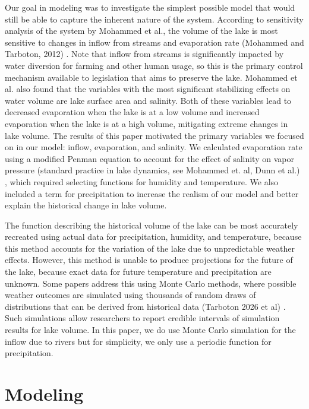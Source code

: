 \documentclass[12pt]{article}
\begin{document}
Our goal in modeling was to investigate the simplest possible model that would still be able to capture the inherent nature of the system. According to sensitivity analysis of the system by Mohammed et al., the volume of the lake is most sensitive to changes in inflow from streams and evaporation rate (Mohammed and Tarboton, 2012) \cite{Mohammed2012}. Note that inflow from streams is significantly impacted by water diversion for farming and other human usage, so this is the primary control mechanism available to legislation that aims to preserve the lake. Mohammed et al. \cite{Mohammed2012} also found that the variables with the most significant stabilizing effects on water volume are lake surface area and salinity. Both of these variables lead to decreased evaporation when the lake is at a low volume and increased evaporation when the lake is at a high volume, mitigating extreme changes in lake volume. The results of this paper motivated the primary variables we focused on in our model: inflow, evaporation, and salinity. We calculated evaporation rate using a modified Penman equation to account for the effect of salinity on vapor pressure (standard practice in lake dynamics, see Mohammed et. al, Dunn et al.) \cite{Mohammed2012}\cite{Dunn2025}, which required selecting functions for humidity and temperature. We also included a term for precipitation to increase the realism of our model and better explain the historical change in lake volume. 

The function describing the historical volume of the lake can be most accurately recreated using actual data for precipitation, humidity, and temperature, because this method accounts for the variation of the lake due to unpredictable weather effects. However, this method is unable to produce projections for the future of the lake, because exact data for future temperature and precipitation are unknown. Some papers address this using Monte Carlo methods, where possible weather outcomes are simulated using thousands of random draws of distributions that can be derived from historical data (Tarboton 2026 et al) \cite{Tarboton2025}. Such simulations allow researchers to report credible intervals of simulation results for lake volume. In this paper, we do use Monte Carlo simulation for the inflow due to rivers but for simplicity, we only use a periodic function for precipitation. 


\section{Modeling}
\end{document}
